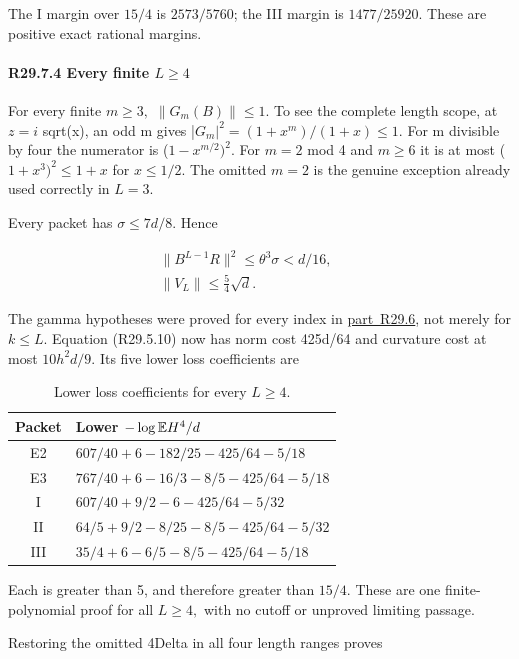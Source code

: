 The I margin over \(15/4\) is \(2573/5760\); the III margin is
\(1477/25920.\) These are positive exact rational margins.

\paragraph{R29.7.4 Every finite \(L\ge 4\)}

For every finite \(m\ge 3,\allowbreak \) \(\lVert G_m(B)\rVert \le 1.\) To see the complete length
scope, at \(z=i\) sqrt(x), an odd m gives
|\(G_m|^2=(1+x^m)/(1+x)\le 1.\) For m divisible by four the numerator is
(\(1-x^{m/2})^2.\) For \(m=2\) mod 4 and \(m\ge 6\) it is at most
(\(1+x^3)^2\le 1+x\) for \(x\le 1/2.\) The omitted \(m=2\) is the genuine
exception already used correctly in \(L=3.\)

Every packet has \(\sigma\le 7d/8.\) Hence

\[
\begin{gathered}
\|B^{L-1}R\|^2\le\theta^3\sigma<d/16,\qquad\\
\|V_L\|\le\frac54\sqrt d.
\end{gathered}\tag{R29.7.3}
\]

The gamma hypotheses were proved for every index in \mbox{\hyperref[part:R29.6]{part R29.6}},
not merely for \(k\le L.\) Equation (R29.5.10) now has norm cost 425d/64
and curvature cost at most \(10h^2d/9.\) Its five lower loss coefficients
are

\begin{table}[htbp]
\centering\small
\setlength{\tabcolsep}{5pt}
\caption{Lower loss coefficients for every $L\ge4$.}\label{tab:oc:r29-long}
\begin{tabular}{cl}
\toprule
Packet & Lower $-\log\mathbb E H^4/d$\\
\midrule
E2 & $607/40+6-182/25-425/64-5/18$\\
E3 & $767/40+6-16/3-8/5-425/64-5/18$\\
I & $607/40+9/2-6-425/64-5/32$\\
II & $64/5+9/2-8/25-8/5-425/64-5/32$\\
III & $35/4+6-6/5-8/5-425/64-5/18$\\
\bottomrule
\end{tabular}
\end{table}

Each is greater than 5, and therefore greater than \(15/4.\) These
are one finite-polynomial proof for all \(L\ge 4,\allowbreak \) with no cutoff or
unproved limiting passage.

Restoring the omitted 4Delta in all four length ranges proves

